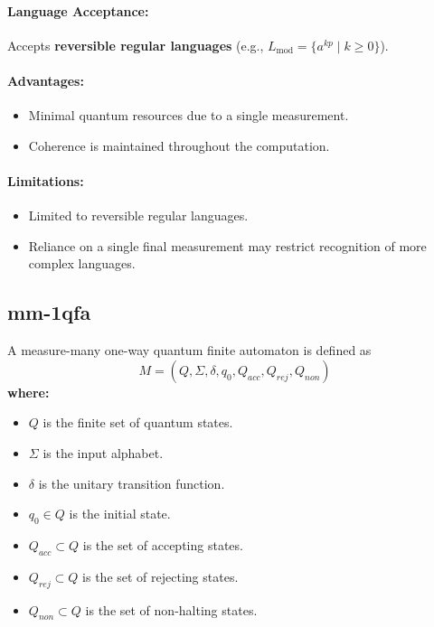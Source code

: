 \paragraph{Language Acceptance:}  
Accepts \textbf{reversible regular languages} (e.g., \( L_{\text{mod}} = \{a^{kp} \mid k \geq 0\} \)).

\paragraph{Advantages:}
\begin{itemize}
    \item Minimal quantum resources due to a single measurement.
    \item Coherence is maintained throughout the computation.
\end{itemize}

\paragraph{Limitations:}
\begin{itemize}
    \item Limited to reversible regular languages.
    \item Reliance on a single final measurement may restrict recognition of more complex languages.
\end{itemize}

\subsection{\acrfull{mm-1qfa}}
\label{subsec:mm-1qfa}
\begin{definition}
A measure-many one-way quantum finite automaton is defined as 
\[
M = (Q, \Sigma, \delta, q_0, Q_{acc}, Q_{rej}, Q_{non})
\]
\textbf{where:}
\begin{itemize}
    \item \( Q \) is the finite set of quantum states.
    \item \( \Sigma \) is the input alphabet.
    \item \( \delta \) is the unitary transition function.
    \item \( q_0 \in Q \) is the initial state.
    \item \( Q_{acc} \subset Q \) is the set of accepting states.
    \item \( Q_{rej} \subset Q \) is the set of rejecting states.
    \item \( Q_{non} \subset Q \) is the set of non-halting states.
\end{itemize}
\end{definition}

